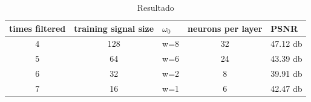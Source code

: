 \begin{table}[h]
    \centering
    \begin{tabular}{|c|c|c|c|l|}
    \hline
    \multicolumn{1}{|l|}{times filtered} & \multicolumn{1}{l|}{training signal size} & \multicolumn{1}{l|}{$\omega_0$} & \multicolumn{1}{l|}{neurons per layer} & PSNR                          \\ \hline
    4                                    & 128                                       & w=8                             & 32                                     & \multicolumn{1}{c|}{47.12 db} \\ \hline
    5                                    & 64                                        & w=6                             & 24                                     & 43.39 db                      \\ \hline
    6                                    & 32                                        & w=2                             & 8                                      & 39.91 db                      \\ \hline
    7                                    & 16                                        & w=1                             & 6                                      & 42.47 db                      \\ \hline
\end{tabular}
\caption{Resultado}
\label{tab:generalization}
\end{table}

